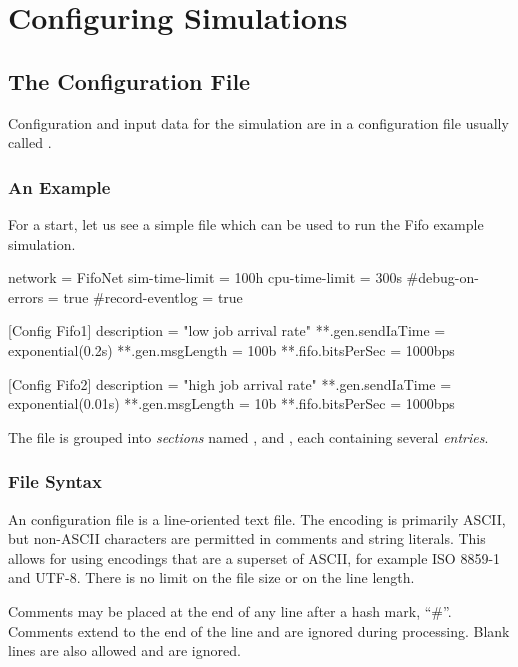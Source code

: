 \chapter{Configuring Simulations}
\label{cha:config-sim}

\section{The Configuration File}
\label{sec:config-sim:config-file}

Configuration and input data for the simulation are in
a configuration file usually called .

\subsection{An Example}
\label{sec:config-sim:example-inifile}

For a start, let us see a simple  file which
can be used to run the Fifo example simulation.

\begin{inifile}
[General]
network = FifoNet
sim-time-limit = 100h
cpu-time-limit = 300s
#debug-on-errors = true
#record-eventlog = true

[Config Fifo1]
description = "low job arrival rate"
**.gen.sendIaTime = exponential(0.2s)
**.gen.msgLength = 100b
**.fifo.bitsPerSec = 1000bps

[Config Fifo2]
description = "high job arrival rate"
**.gen.sendIaTime = exponential(0.01s)
**.gen.msgLength = 10b
**.fifo.bitsPerSec = 1000bps
\end{inifile}

The file is grouped into \textit{sections} named \ttt{[General]}, 
and , each containing several \textit{entries}.


\subsection{File Syntax}
\label{sec:config-sim:inifile-syntax}

An {\opp} configuration file is a line-oriented text file. The encoding is
primarily ASCII, but non-ASCII characters are permitted in comments
and string literals. This allows for using encodings that are a superset of
ASCII, for example ISO 8859-1 and UTF-8. There is no limit on the file size or
on the line length.

Comments may be placed at the end of any line after a hash mark, ``\#''.
Comments extend to the end of the line and are ignored during processing.
Blank lines are also allowed and are ignored.

